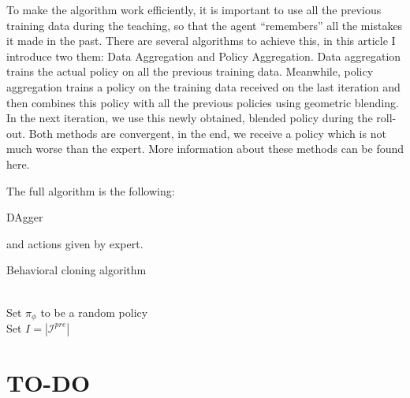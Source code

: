 \documentclass{article}
\begin{document}
To make the algorithm work efficiently, it is important to use all the previous training data during the teaching, so that the agent “remembers” all the mistakes it made in the past. There are several algorithms to achieve this, in this article I introduce two them: Data Aggregation and Policy Aggregation. Data aggregation trains the actual policy on all the previous training data. Meanwhile, policy aggregation trains a policy on the training data received on the last iteration and then combines this policy with all the previous policies using geometric blending. In the next iteration, we use this newly obtained, blended policy during the roll-out. Both methods are convergent, in the end, we receive a policy which is not much worse than the expert. More information about these methods can be found here.

The full algorithm is the following:



\begin{algorithm}
\onehalfspacing
\caption{DAgger} 
\begin{algorithmic}[1]
	and actions given by expert.
	\\
	\EndFor 
\end{algorithmic} 
\end{algorithm}

\begin{algorithm}
\caption{Behavioral cloning algorithm}\label{algo:BC}
\begin{algorithmic}[1]
	\\
	Set {$\pi_\phi$ to be a random policy}\\
	Set {$I = |\mathcal{I}^{pre}| $}
		
	\end{algorithmic}
\end{algorithm}


\section{TO-DO}
\end{document}
